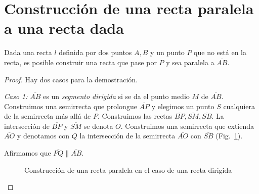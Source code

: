 \section{Construcción de una recta paralela a una recta dada}\label{s.parallel}

\begin{theorem}\label{thm.straight-parallel}
Dada una recta $l$ definida por dos puntos $A,B$ y un punto $P$ que no está en la recta, es posible construir una recta que pase por $P$ y sea paralela a $\overline{AB}$.
\end{theorem}

\begin{proof}

Hay dos casos para la demostración.

\textit{Caso 1:}
$\overline{AB}$ es un \emph{segmento dirigida} si se da el punto medio $M$ de $\overline{AB}$.  Construimos una semirrecta que prolongue $\overline{AP}$ y elegimos un punto $S$ cualquiera de la semirrecta más allá de $P$. Construimos las rectas $\overline{BP}, \overline{SM}, \overline{SB}$. La intersección de $\overline{BP}$ y $\overline{SM}$ se denota $O$. Construimos una semirrecta que extienda $\overline{AO}$ y denotamos con $Q$ la intersección de la semirrecta $\overline{AO}$ con $\overline{SB}$ (Fig.~\ref{f.se-parallel-directed}).

Afirmamos que $\overline{PQ}\parallel \overline{AB}$. 

\begin{figure}%
\begin{center}
\end{center}
\caption{Construcción de una recta paralela en el caso de una recta dirigida}\label{f.se-parallel-directed}
\end{figure}


\end{proof}
